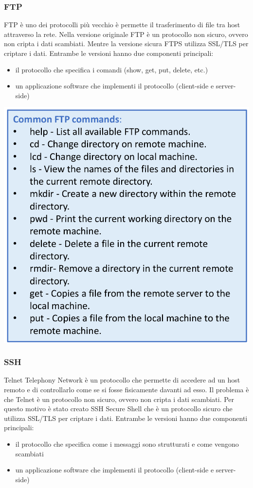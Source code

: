 \documentclass[12pt]{article}
\begin{document}
\subsubsection{FTP}
FTP è uno dei protocolli più vecchio è permette il trasferimento di file tra host attraverso la rete.
Nella versione originale FTP è un protocollo non sicuro, ovvero non cripta i dati scambiati.
Mentre la versione sicura FTPS utilizza SSL/TLS per criptare i dati.
Entrambe le versioni hanno due componenti principali:
\begin{itemize}
    \item il protocollo che specifica i comandi (show, get, put, delete, etc.)
    \item un applicazione software che implementi il protocollo (client-side e server-side)
\end{itemize}
\includegraphics[scale=.3]{img/ftp-commands.png}

\subsubsection{SSH}
Telnet Telephony Network è un protocollo che permette di accedere ad un host remoto e di controllarlo come se si fosse fisicamente davanti ad esso.
Il problema è che Telnet è un protocollo non sicuro, ovvero non cripta i dati scambiati.
Per questo motivo è stato creato SSH Secure Shell che è un protocollo sicuro che utilizza SSL/TLS per criptare i dati.
Entrambe le versioni hanno due componenti principali:
\begin{itemize}
    \item il protocollo che specifica come i messaggi sono strutturati e come vengono scambiati
    \item un applicazione software che implementi il protocollo (client-side e server-side)
\end{itemize}
\end{document}
